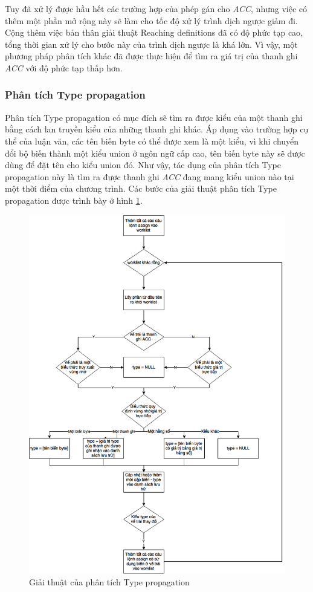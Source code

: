 Tuy đã xử lý được hầu hết các trường hợp của phép gán cho \textit{ACC}, nhưng việc có thêm một phần mở rộng này sẽ làm cho tốc độ xử lý trình dịch ngược giảm đi. Cộng thêm việc bản thân giải thuật Reaching definitions đã có độ phức tạp cao, tổng thời gian xử lý cho bước này của trình dịch ngược là khá lớn. Vì vậy, một phương pháp phân tích khác đã được thực hiện để tìm ra giá trị của thanh ghi \textit{ACC} với độ phức tạp thấp hơn.

\subsubsection{Phân tích Type propagation}
Phân tích Type propagation có mục đích sẽ tìm ra được kiểu của một thanh ghi bằng cách lan truyền kiểu của những thanh ghi khác. Áp dụng vào trường hợp cụ thể của luận văn, các tên biến byte có thể được xem là một kiểu, vì khi chuyển đổi bộ biến thành một kiểu union ở ngôn ngữ cấp cao, tên biến byte này sẽ được dùng để đặt tên cho kiểu union đó. Như vậy, tác dụng của phân tích Type propagation này là tìm ra được thanh ghi \textit{ACC} đang mang kiểu union nào tại một thời điểm của chương trình. Các bước của giải thuật phân tích Type propagation được trình bày ở hình \ref{fig:typepropagationalgo}.

\begin{figure}[h!]
	\centering
	\includegraphics[width=0.7\linewidth]{image/typePropagationAlgo}
	\caption{Giải thuật của phân tích Type propagation}
	\label{fig:typepropagationalgo}
\end{figure}

